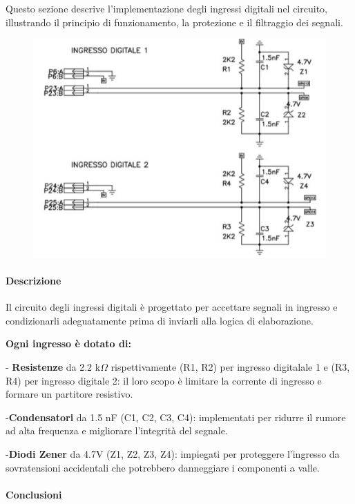 \documentclass[12pt,a4paper]{report}
\begin{document}
Questo sezione descrive l'implementazione degli ingressi digitali nel circuito, illustrando il principio di funzionamento, la protezione e il filtraggio dei segnali.
\begin{figure}[H]
    \centering
    \includegraphics[width=\linewidth]{../image/IngressiDigitali.png}
    \caption{ }
\end{figure}

\paragraph{Descrizione}
Il circuito degli ingressi digitali è progettato per accettare segnali in ingresso e condizionarli adeguatamente prima di inviarli alla logica di elaborazione. 

\textbf{Ogni ingresso è dotato di:}

- \textbf{Resistenze} da 2.2 k$\Omega$
 rispettivamente (R1, R2) per ingresso digitalale 1 e (R3, R4) per ingresso digitale 2: 
il loro scopo è limitare la corrente di ingresso e formare un partitore resistivo.

-\textbf{Condensatori} da 1.5 nF (C1, C2, C3, C4): 
implementati per ridurre il rumore ad alta frequenza e migliorare l'integrità del segnale.

-\textbf{Diodi Zener} da 4.7V (Z1, Z2, Z3, Z4): impiegati per proteggere l'ingresso da sovratensioni accidentali che potrebbero danneggiare i componenti a valle.

\paragraph{Conclusioni}
\end{document}
